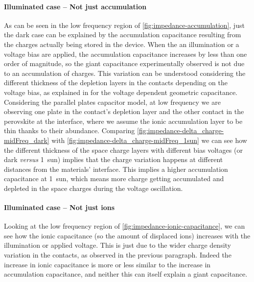 	\paragraph{Illuminated case -- Not just accumulation}
	As can be seen in the low frequency region of \cref{fig:impedance-accumulation}, just the dark case can be explained by the accumulation capacitance resulting from the charges actually being stored in the device.
	When the an illumination or a voltage bias are applied, the accumulation capacitance increases by less than one order of magnitude, so the giant capacitance experimentally observed is not due to an accumulation of charges.
	This variation can be understood considering the different thickness of the depletion layers in the contacts depending on the voltage bias, as explained in  for the voltage dependent geometric capacitance.
	Considering the parallel plates capacitor model, at low frequency we are observing one plate in the contact's depletion layer and the other contact in the perovskite at the interface, where we assume the ionic accumulation layer to be thin thanks to their abundance.
	Comparing \cref{fig:impedance-delta_charge-midFreq_dark} with \cref{fig:impedance-delta_charge-midFreq_1sun} we can see how the different thickness of the space charge layers with different bias voltages (or dark \textsl{versus} \SI{1}{sun}) implies that the charge variation happens at different distances from the materials' interface.
	This implies a higher accumulation capacitance at \SI{1}{sun}, which means more charge getting accumulated and depleted in the space charges during the voltage oscillation.
	
		\paragraph{Illuminated case -- Not just ions}
	Looking at the low frequency region of \cref{fig:impedance-ionic-capacitance}, we can see how the ionic capacitance (so the amount of displaced ions) increases with the illumination or applied voltage.
	This is just due to the wider charge density variation in the contacts, as observed in the previous paragraph.
	Indeed the increase in ionic capacitance is more or less similar to the increase in accumulation capacitance, and neither this can itself explain a giant capacitance.

